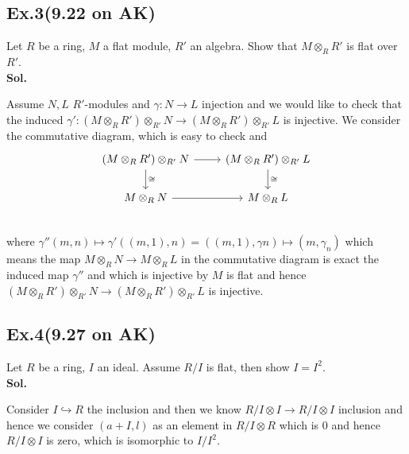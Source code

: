 \documentclass[lang=en,11pt,a4paper,citestyle =authoryear]{elegantpaper}
\begin{document}
\par 
\vspace{0.5em}

\subsection*{Ex.3(9.22 on AK)} 
Let $R$ be a ring, $M$ a flat module, $R'$ an algebra. Show that $M\otimes_R R'$ is flat over $R'$.
\vspace{0.5em}\\
\textbf{Sol.} \par
Assume $N,L$ $R'$-modules and $\gamma: N\to L$ injection and we would like to check that the induced $\gamma':(M\otimes_R R')\otimes_{R'} N \to (M\otimes_R R')\otimes_{R'} L$ is injective. We consider the commutative diagram, which is easy to check and
\[
\begin{tikzcd}
    (M\otimes_R R')\otimes_{R'} N\arrow[d,"\cong"]\arrow[r] & (M\otimes_R R')\otimes_{R'} L\arrow[d,"\cong"] \\
M \otimes_R N\arrow[r] & M\otimes_R L \\
\end{tikzcd}
\]
where $\gamma''(m,n) \mapsto \gamma'((m,1),n) = ((m,1),\gamma n)\mapsto (m,\gamma_n)$
which means the map $M\otimes_R N \to M\otimes_R L$ in the commutative diagram is exact the induced map $\gamma''$ and which is injective by $M$ is flat and hence $(M\otimes_R R')\otimes_{R'} N\to (M\otimes_R R')\otimes_{R'} L$ is injective.
\par 
\vspace{0.5em}

\subsection*{Ex.4(9.27 on AK)} 
Let $R$ be a ring, $I$ an ideal. Assume $R/I$ is flat, then show $I = I^2$.
\vspace{0.5em}\\
\textbf{Sol.} \par
Consider $I\hookrightarrow R$ the inclusion and then we know $R/I \otimes I \to R/I \otimes I$ inclusion and hence we consider $(a+I,l)$ as an element in $R/I\otimes R$ which is $0$ and hence $R/I \otimes I$ is zero, which is isomorphic to $I/I^2$.
\par 
\vspace{0.5em}
\end{document}
